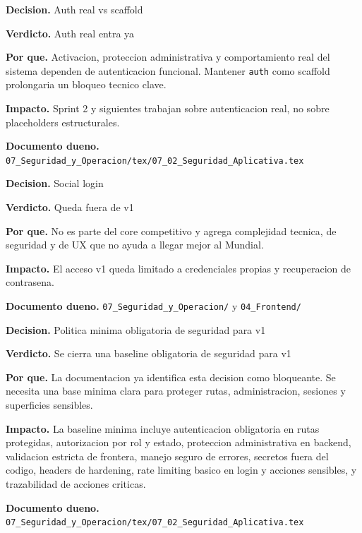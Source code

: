 \begin{docnote}
\textbf{Decision.} Auth real vs scaffold

\textbf{Verdicto.} Auth real entra ya

\textbf{Por que.} Activacion, proteccion administrativa y comportamiento real del sistema dependen de autenticacion funcional. Mantener \texttt{auth} como scaffold prolongaria un bloqueo tecnico clave.

\textbf{Impacto.} Sprint 2 y siguientes trabajan sobre autenticacion real, no sobre placeholders estructurales.

\textbf{Documento dueno.} \texttt{07\_Seguridad\_y\_Operacion/tex/07\_02\_Seguridad\_Aplicativa.tex}
\end{docnote}

\begin{docnote}
\textbf{Decision.} Social login

\textbf{Verdicto.} Queda fuera de v1

\textbf{Por que.} No es parte del core competitivo y agrega complejidad tecnica, de seguridad y de UX que no ayuda a llegar mejor al Mundial.

\textbf{Impacto.} El acceso v1 queda limitado a credenciales propias y recuperacion de contrasena.

\textbf{Documento dueno.} \texttt{07\_Seguridad\_y\_Operacion/} y \texttt{04\_Frontend/}
\end{docnote}

\begin{docnote}
\textbf{Decision.} Politica minima obligatoria de seguridad para v1

\textbf{Verdicto.} Se cierra una baseline obligatoria de seguridad para v1

\textbf{Por que.} La documentacion ya identifica esta decision como bloqueante. Se necesita una base minima clara para proteger rutas, administracion, sesiones y superficies sensibles.

\textbf{Impacto.} La baseline minima incluye autenticacion obligatoria en rutas protegidas, autorizacion por rol y estado, proteccion administrativa en backend, validacion estricta de frontera, manejo seguro de errores, secretos fuera del codigo, headers de hardening, rate limiting basico en login y acciones sensibles, y trazabilidad de acciones criticas.

\textbf{Documento dueno.} \texttt{07\_Seguridad\_y\_Operacion/tex/07\_02\_Seguridad\_Aplicativa.tex}
\end{docnote}

